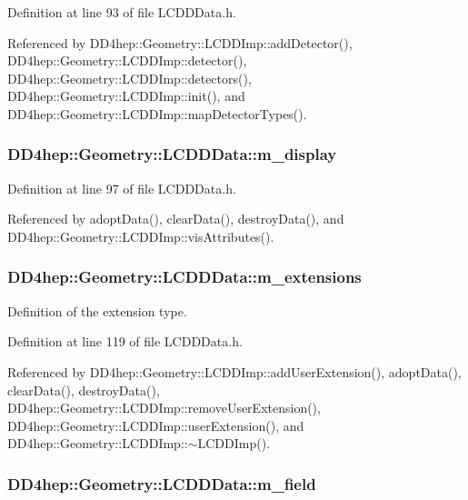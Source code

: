 Definition at line 93 of file LCDDData.h.

Referenced by DD4hep::Geometry::LCDDImp::addDetector(), DD4hep::Geometry::LCDDImp::detector(), DD4hep::Geometry::LCDDImp::detectors(), DD4hep::Geometry::LCDDImp::init(), and DD4hep::Geometry::LCDDImp::mapDetectorTypes().\hypertarget{class_d_d4hep_1_1_geometry_1_1_l_c_d_d_data_a757b3e4c1dbd399b518551a689ac6614}{
\subsubsection[{m\_\-display}]{ {\bf DD4hep::Geometry::LCDDData::m\_\-display}}}
\label{class_d_d4hep_1_1_geometry_1_1_l_c_d_d_data_a757b3e4c1dbd399b518551a689ac6614}


Definition at line 97 of file LCDDData.h.

Referenced by adoptData(), clearData(), destroyData(), and DD4hep::Geometry::LCDDImp::visAttributes().\hypertarget{class_d_d4hep_1_1_geometry_1_1_l_c_d_d_data_a686aca104b9460a62e5a89d8abbd3b7c}{
\subsubsection[{m\_\-extensions}]{ {\bf DD4hep::Geometry::LCDDData::m\_\-extensions}}}
\label{class_d_d4hep_1_1_geometry_1_1_l_c_d_d_data_a686aca104b9460a62e5a89d8abbd3b7c}


Definition of the extension type. 

Definition at line 119 of file LCDDData.h.

Referenced by DD4hep::Geometry::LCDDImp::addUserExtension(), adoptData(), clearData(), destroyData(), DD4hep::Geometry::LCDDImp::removeUserExtension(), DD4hep::Geometry::LCDDImp::userExtension(), and DD4hep::Geometry::LCDDImp::$\sim$LCDDImp().\hypertarget{class_d_d4hep_1_1_geometry_1_1_l_c_d_d_data_a42d36b262bf1bf83780264efcd227bcd}{
\subsubsection[{m\_\-field}]{ {\bf DD4hep::Geometry::LCDDData::m\_\-field}}}
\label{class_d_d4hep_1_1_geometry_1_1_l_c_d_d_data_a42d36b262bf1bf83780264efcd227bcd}


